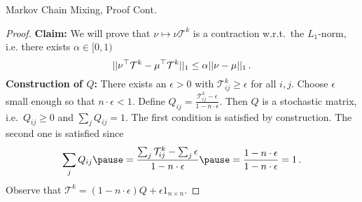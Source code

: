 \begin{frame}{Markov Chain Mixing, Proof Cont.}
    \begin{proof}
        \textbf{Claim:} We will prove that $\nu \mapsto \nu \mathcal{T}^k$ is a contraction w.r.t.\ the $L_1$-norm, i.e. there exists $\alpha \in [0,1)$
        \begin{equation}
           ||\nu^{\top} \mathcal{T}^k - \mu^{\top} \mathcal{T}^k||_1 \leq \alpha ||\nu - \mu||_1\,.
        \end{equation}
        \pause
        \textbf{Construction of $Q$:}
        There exists an $\epsilon > 0$ with $\mathcal{T}^k_{ij} \geq \epsilon$ for all $i,j$.
        \pause
        Choose $\epsilon$ small enough so that $n \cdot \epsilon < 1$.
        Define $Q_{ij} = \frac{\mathcal{T}^k_{ij} - \epsilon}{1 - n \cdot \epsilon}$.
        \pause
        Then $Q$ is a stochastic matrix, i.e.\ $Q_{ij} \geq 0$ and $\sum_j Q_{ij} = 1$. 
        \pause
        The first condition is satisfied by construction.
        \pause The second one is satisfied since
        \begin{equation}
            \sum_j Q_{ij} \pause = \frac{\sum_j \mathcal{T}^k_{ij} - \sum_j \epsilon}{1 - n \cdot \epsilon} \pause = \frac{1 - n \cdot \epsilon}{1 - n \cdot \epsilon} = 1\,.
        \end{equation}
    \pause
    Observe that $\mathcal{T}^k = (1-n \cdot \epsilon) Q + \epsilon 1_{n \times n}$.
    \end{proof}
    \end{frame}
